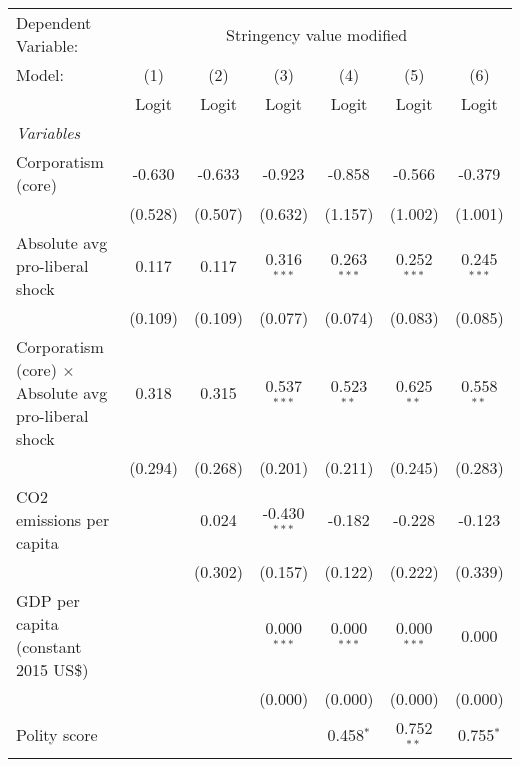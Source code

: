 
\begingroup
\centering
\begin{tabular}{lcccccc}
   \toprule
   Dependent Variable: & \multicolumn{6}{c}{Stringency value modified}\\
   Model:                                                      & (1)     & (2)     & (3)            & (4)           & (5)           & (6)\\  
                                                               &  Logit  & Logit   & Logit          & Logit         & Logit         & Logit\\  
   \midrule
   \emph{Variables}\\
   Corporatism (core)                                          & -0.630  & -0.633  & -0.923         & -0.858        & -0.566        & -0.379\\   
                                                               & (0.528) & (0.507) & (0.632)        & (1.157)       & (1.002)       & (1.001)\\   
   Absolute avg pro-liberal shock                              & 0.117   & 0.117   & 0.316$^{***}$  & 0.263$^{***}$ & 0.252$^{***}$ & 0.245$^{***}$\\   
                                                               & (0.109) & (0.109) & (0.077)        & (0.074)       & (0.083)       & (0.085)\\   
   Corporatism (core) $\times$ Absolute avg pro-liberal shock  & 0.318   & 0.315   & 0.537$^{***}$  & 0.523$^{**}$  & 0.625$^{**}$  & 0.558$^{**}$\\   
                                                               & (0.294) & (0.268) & (0.201)        & (0.211)       & (0.245)       & (0.283)\\   
   CO2 emissions per capita                                    &         & 0.024   & -0.430$^{***}$ & -0.182        & -0.228        & -0.123\\   
                                                               &         & (0.302) & (0.157)        & (0.122)       & (0.222)       & (0.339)\\   
   GDP per capita (constant 2015 US\$)                         &         &         & 0.000$^{***}$  & 0.000$^{***}$ & 0.000$^{***}$ & 0.000\\   
                                                               &         &         & (0.000)        & (0.000)       & (0.000)       & (0.000)\\   
   Polity score                                                &         &         &                & 0.458$^{*}$   & 0.752$^{**}$  & 0.755$^{*}$\\   

\end{tabular}
